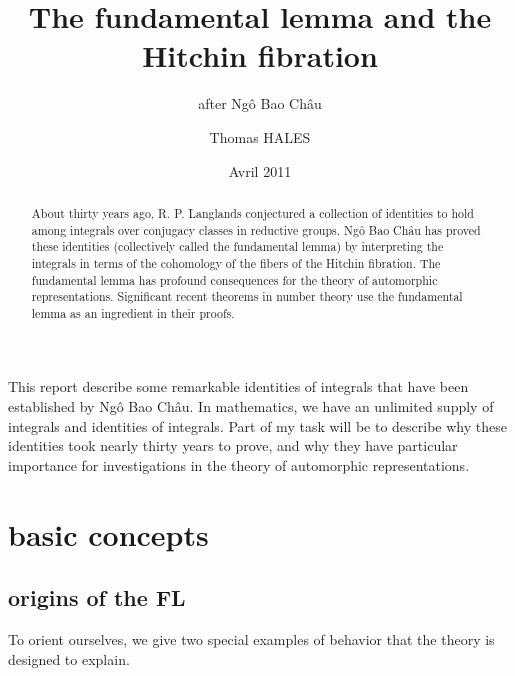 \documentclass[brochure,english,12pt]{bourbaki}
\date{Avril 2011}
\title{The fundamental lemma and the Hitchin fibration}
\subtitle{after Ng\^o Bao Ch\^au}
\author{Thomas HALES}
\newcommand{\NBC}{Ng\^o Bao Ch\^au}
\begin{document}
\maketitle



{


}

\bigskip



This report describe some remarkable identities of integrals that have
been established by \NBC.  In mathematics, we have an unlimited supply
of integrals and identities of integrals.  Part of my task 
will be to describe why these identities took nearly thirty years to
prove, and why they have particular importance for investigations in
the theory of automorphic representations.

\begin{abstract}
About thirty years ago, R. P. Langlands conjectured a collection of
identities to hold among integrals over conjugacy classes in
reductive groups.  Ng\^o Bao Ch\^au has proved these identities
(collectively called the fundamental lemma) by interpreting the
integrals in terms of the cohomology of the fibers of the Hitchin
fibration.  The fundamental lemma has profound consequences for the
theory of automorphic representations. Significant recent theorems in
number theory use the fundamental lemma as an ingredient in their
proofs.
\end{abstract}


\section{basic concepts}

\subsection{origins of the FL}


To orient ourselves, we give two special examples of
behavior that the theory is designed to explain.
\end{document}
